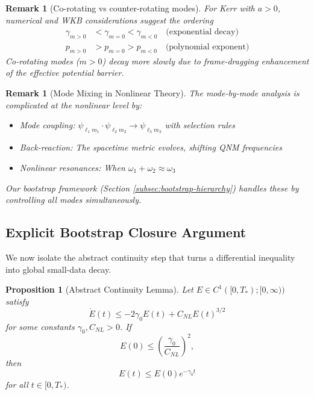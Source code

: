 \documentclass[12pt,a4paper]{article}
\newtheorem{proposition}[theorem]{Proposition}
\newtheorem{remark}[theorem]{Remark}
\begin{document}
\begin{remark}[Co-rotating vs counter-rotating modes]\label{thm:corotating}
For Kerr with $a > 0$, numerical and WKB considerations suggest the ordering
\begin{align}
\gamma_{m > 0} &< \gamma_{m = 0} < \gamma_{m < 0} \quad \text{(exponential decay)} \\
p_{m > 0} &> p_{m = 0} > p_{m < 0} \quad \text{(polynomial exponent)}
\end{align}
Co-rotating modes ($m > 0$) decay more slowly due to frame-dragging enhancement of the effective potential barrier.
\end{remark}

\begin{remark}[Mode Mixing in Nonlinear Theory]
The mode-by-mode analysis is complicated at the nonlinear level by:
\begin{itemize}
    \item Mode coupling: $\psi_{\ell_1 m_1} \cdot \psi_{\ell_2 m_2} \to \psi_{\ell_3 m_3}$ with selection rules
    \item Back-reaction: The spacetime metric evolves, shifting QNM frequencies
    \item Nonlinear resonances: When $\omega_1 + \omega_2 \approx \omega_3$
\end{itemize}
Our bootstrap framework (Section \ref{subsec:bootstrap-hierarchy}) handles these by controlling all modes simultaneously.
\end{remark}

\subsection{Explicit Bootstrap Closure Argument}\label{subsec:explicit-bootstrap}

We now isolate the abstract continuity step that turns a differential inequality into global small-data decay.

\begin{proposition}[Abstract Continuity Lemma]\label{thm:quantitative-bootstrap}\label{lem:abstract-bootstrap}
Let $E \in C^1([0,T_*);[0,\infty))$ satisfy
\begin{equation}\label{eq:abstract-bootstrap-ode}
\dot E(t) \le -2\gamma_0 E(t) + C_{NL} E(t)^{3/2}
\end{equation}
for some constants $\gamma_0,C_{NL}>0$. If
\begin{equation}
E(0) \le \left(\frac{\gamma_0}{C_{NL}}\right)^2,
\end{equation}
then
\begin{equation}
E(t) \le E(0)e^{-\gamma_0 t}
\end{equation}
for all $t\in[0,T_*)$.
\end{proposition}
\end{document}
